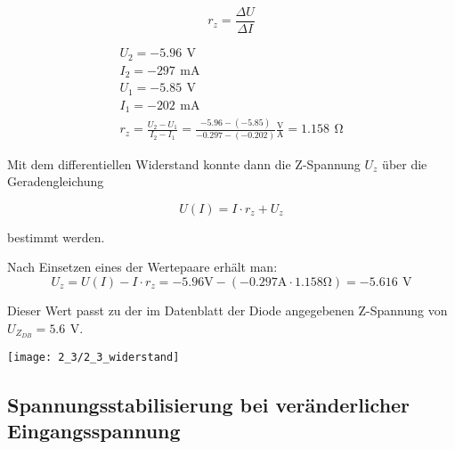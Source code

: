 \documentclass[a4paper, 12pt]{article}
\begin{document}
$$ r_z = \frac{\Delta U}{\Delta I} $$

\begin{gather*}
  U_2 = -5.96 \,\ \si{\volt}\\
  I_2 = -297 \,\ \si{\milli\ampere}\\
  U_1 = -5.85 \,\ \si{\volt}\\
  I_1 = -202 \,\ \si{\milli\ampere}\\
  r_z = \frac{U_2 - U_1}{I_2-I_1} = \frac{-5.96 - (-5.85)}{-0.297 - (-0.202)}
  \frac{\si{\volt}}{\si{\ampere}} = 1.158 \,\ \si{\ohm}
\end{gather*}

Mit dem differentiellen Widerstand konnte dann die Z-Spannung $U_z$ über die Geradengleichung

$$U(I) = I \cdot r_z + U_z$$

\noindent bestimmt werden.

\noindent Nach Einsetzen eines der Wertepaare erhält man:
$$ U_z = U(I) - I\cdot r_z = -5.96 \si{\volt} - (-0.297 \si{\ampere} \cdot 1.158
\si{\ohm}) = -5.616 \,\ \si{\volt} $$

\noindent Dieser Wert passt zu der im Datenblatt der Diode angegebenen
Z-Spannung von $U_{Z_{DB}} = 5.6 \,\ \si{\volt}$.
\begin{center}
 \texttt{[image: 2\_3/2\_3\_widerstand]}
\end{center}

\subsection{Spannungsstabilisierung bei veränderlicher Eingangsspannung}
\end{document}
